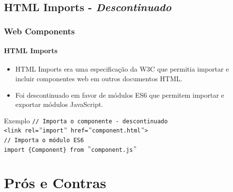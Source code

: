 \documentclass[
	9pt, %
	t, %
]{beamer}
\begin{document}
\subsection{HTML Imports - \textit{Descontinuado}}

\begin{frame}
	\frametitle{Web Components}
	\framesubtitle{HTML Imports}
	\begin{itemize}
		\item HTML Imports era uma especificação da W3C que permitia importar e incluir componentes web em outros documentos HTML.
		\item Foi descontinuado em favor de módulos ES6 que permitem importar e exportar módulos JavaScript.
	\end{itemize}

	\begin{block}{Exemplo}
		\texttt{// Importa o componente - \alert{descontinuado}}\\
		\texttt{<link rel=$"$import$"$ href=$"$component.html$"$>}\\

		\bigskip 
		\texttt{// Importa o módulo ES6}\\
		\texttt{import \{Component\} from $"$component.js$"$}
	\end{block}

\end{frame}

\section{Prós e Contras}
\end{document}
